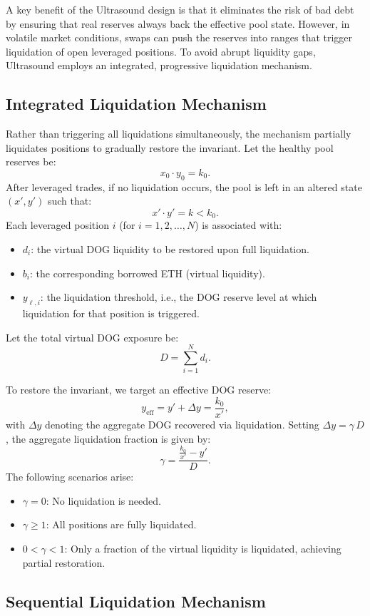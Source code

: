 \documentclass[11pt]{article}
\begin{document}
A key benefit of the Ultrasound design is that it eliminates the risk of bad debt by ensuring that real reserves always back the effective pool state. However, in volatile market conditions, swaps can push the reserves into ranges that trigger liquidation of open leveraged positions. To avoid abrupt liquidity gaps, Ultrasound employs an integrated, progressive liquidation mechanism.

\subsection{Integrated Liquidation Mechanism}

Rather than triggering all liquidations simultaneously, the mechanism partially liquidates positions to gradually restore the invariant. Let the healthy pool reserves be:
\[
x_0 \cdot y_0 = k_0.
\]
After leveraged trades, if no liquidation occurs, the pool is left in an altered state \((x', y')\) such that:
\[
x' \cdot y' = k < k_0.
\]
Each leveraged position \(i\) (for \(i=1,2,\ldots,N\)) is associated with:
\begin{itemize}
    \item \(d_i\): the virtual DOG liquidity to be restored upon full liquidation.
    \item \(b_i\): the corresponding borrowed ETH (virtual liquidity).
    \item \(y_{\ell,i}\): the liquidation threshold, i.e., the DOG reserve level at which liquidation for that position is triggered.
\end{itemize}
Let the total virtual DOG exposure be:
\[
D = \sum_{i=1}^{N} d_i.
\]

To restore the invariant, we target an effective DOG reserve:
\[
y_{\mathrm{eff}} = y' + \Delta y = \frac{k_0}{x'},
\]
with \(\Delta y\) denoting the aggregate DOG recovered via liquidation. Setting \(\Delta y = \gamma\,D\), the aggregate liquidation fraction is given by:
\[
\gamma = \frac{\frac{k_0}{x'} - y'}{D}.
\]
The following scenarios arise:
\begin{itemize}
    \item \(\gamma=0\): No liquidation is needed.
    \item \(\gamma\geq 1\): All positions are fully liquidated.
    \item \(0 < \gamma < 1\): Only a fraction of the virtual liquidity is liquidated, achieving partial restoration.
\end{itemize}

\subsection{Sequential Liquidation Mechanism}
\end{document}
